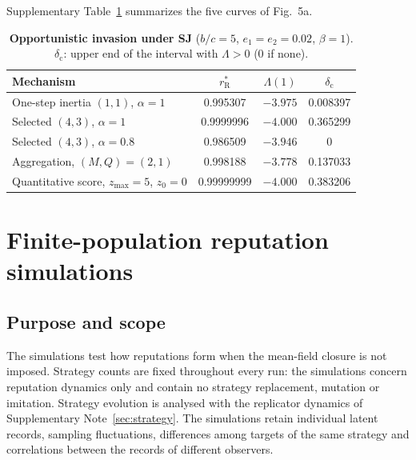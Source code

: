 \documentclass[fleqn,10pt]{article}
\theoremstyle{plain}
\theoremstyle{remark}
\newcommand{\FigOpportunism}{5}
\newcommand{\rR}{r^*_{\mathrm R}}
\begin{document}
Supplementary Table~\ref{tab:fig5} summarizes the five curves of
Fig.~\FigOpportunism a.

\begin{table}[htbp]
\centering\small
\caption{\textbf{Opportunistic invasion under SJ} ($b/c=5$, $e_1=e_2=0.02$, $\beta=1$). $\delta_{\mathrm c}$: upper end of the interval with $\Lambda>0$ (0 if none).}
\label{tab:fig5}
\begin{tabular}{@{}lccc@{}}
\toprule
Mechanism & $\rR$ & $\Lambda(1)$ & $\delta_{\mathrm c}$\\
\midrule
One-step inertia $(1,1)$, $\alpha=1$ & 0.995307 & $-3.975$ & 0.008397\\
Selected $(4,3)$, $\alpha=1$ & 0.9999996 & $-4.000$ & 0.365299\\
Selected $(4,3)$, $\alpha=0.8$ & 0.986509 & $-3.946$ & 0\\
Aggregation, $(M,Q)=(2,1)$ & 0.998188 & $-3.778$ & 0.137033\\
Quantitative score, $z_{\max}=5$, $z_0=0$ & 0.99999999 & $-4.000$ & 0.383206\\
\bottomrule
\end{tabular}
\end{table}

\section{Finite-population reputation simulations}
\label{sec:simulations}

\subsection{Purpose and scope}
The simulations test how reputations form when the mean-field closure is not
imposed. Strategy counts are fixed throughout every run: the simulations
concern reputation dynamics only and contain no strategy replacement, mutation
or imitation. Strategy evolution is analysed with the replicator dynamics of
Supplementary Note~\ref{sec:strategy}. The simulations retain individual
latent records, sampling fluctuations, differences among targets of the same
strategy and correlations between the records of different observers.
\end{document}
